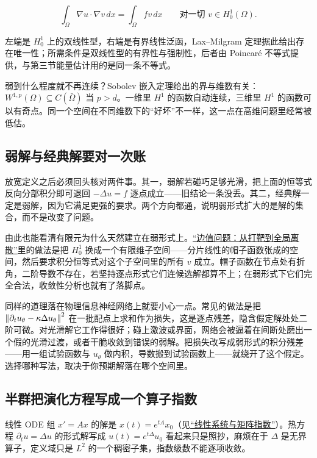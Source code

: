 \[
\int_\Omega\nabla u\cdot\nabla v\,dx=\int_\Omega fv\,dx
\qquad\text{对一切 }v\in H_0^1(\Omega).
\]

左端是 \(H_0^1\) 上的双线性型，右端是有界线性泛函，Lax--Milgram 定理据此给出存在唯一性；所需条件是双线性型的有界性与强制性，后者由 Poincaré 不等式提供，与第三节能量估计用的是同一条不等式。

弱到什么程度就不再连续？Sobolev 嵌入定理给出的界与维数有关：\(W^{1,p}(\Omega)\subseteq C(\bar\Omega)\) 当 \(p>d\)。一维里 \(H^1\) 的函数自动连续，三维里 \(H^1\) 的函数可以有奇点。同一个空间在不同维数下的``好坏''不一样，这一点在高维问题里经常被低估。

\subsection{弱解与经典解要对一次账}

放宽定义之后必须回头核对两件事。其一，弱解若碰巧足够光滑，把上面的恒等式反向分部积分即可退回 \(-\Delta u=f\) 逐点成立——旧结论一条没丢。其二，经典解一定是弱解，因为它满足更强的要求。两个方向都通，说明弱形式扩大的是解的集合，而不是改变了问题。

由此也能看清有限元为什么天然建立在弱形式上。\hyperref[sec:08-Numerical-Analysis/06-ODE/04]{``边值问题：从打靶到全局离散''}里的做法是把 \(H_0^1\) 换成一个有限维子空间——分片线性的帽子函数张成的空间，然后要求积分恒等式对这个子空间里的所有 \(v\) 成立。帽子函数在节点处有折角，二阶导数不存在，若坚持逐点形式它们连候选解都算不上；在弱形式下它们完全合法，收敛性分析也就有了落脚点。

同样的道理落在物理信息神经网络上就要小心一点。常见的做法是把 \(\left\lVert\partial_tu_\theta-\kappa\Delta u_\theta\right\rVert^2\) 在一批配点上求和作为损失，这是逐点残差，隐含假定解处处二阶可微。对光滑解它工作得很好；碰上激波或界面，网络会被逼着在间断处磨出一个假的光滑过渡，或者干脆收敛到错误的弱解。把损失改写成弱形式的积分残差——用一组试验函数与 \(u_\theta\) 做内积，导数搬到试验函数上——就绕开了这个假定。选择哪种写法，取决于你预期解落在哪个空间里。

\subsection{半群把演化方程写成一个算子指数}

线性 ODE 组 \(x'=Ax\) 的解是 \(x(t)=e^{tA}x_0\)（见\hyperref[sec:15-Differential-Equations-and-Dynamical-Systems/01-ODE-Theory/02]{``线性系统与矩阵指数''}）。热方程 \(\partial_tu=\Delta u\) 的形式解写成 \(u(t)=e^{t\Delta}u_0\) 看起来只是照抄，麻烦在于 \(\Delta\) 是无界算子，定义域只是 \(L^2\) 的一个稠密子集，指数级数不能逐项收敛。

